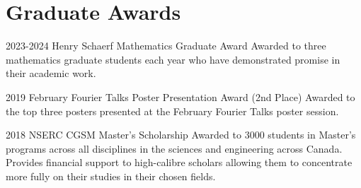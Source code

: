 \documentclass[a4paper]{cv-friggeri}
\begin{document}




\section{Graduate Awards}

\begin{entrylist}

\entry
{2023-2024}
{Henry Schaerf Mathematics Graduate Award}
{}
{Awarded to three mathematics graduate students each year who have demonstrated promise in their academic work.}

\entry
{2019}
{February Fourier Talks Poster Presentation Award (2nd Place)}
{}
{Awarded to the top three posters presented at the February Fourier Talks poster session.}

\entry
{2018}
{NSERC CGSM Master's Scholarship}
{}
{Awarded to 3000 students in Master's programs across all disciplines in the sciences and engineering across Canada. Provides financial support to high-calibre scholars allowing them to concentrate more fully on their studies in their chosen fields.}

\end{entrylist}


\newpage

\end{document}
